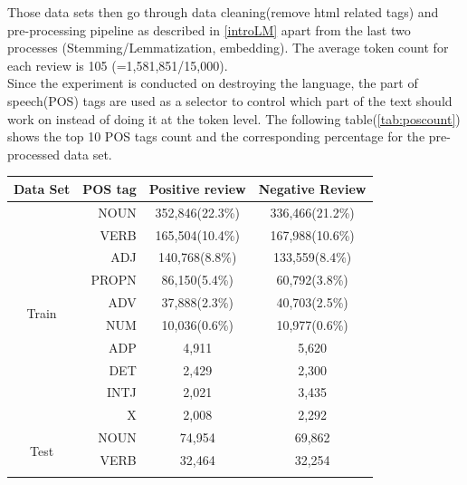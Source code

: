 \documentclass[12pt]{article}
\begin{document}
Those data sets then go through data cleaning(remove html related tags) and pre-processing pipeline as described in \ref{introLM} apart from the last two processes (Stemming/Lemmatization, embedding). The average token count for each review is 105 (=1,581,851/15,000). \\

Since the experiment is conducted on destroying the language, the part of speech(POS) tags are used as a selector to control which part of the text should work on instead of doing it at the token level. The following table(\ref{tab:poscount}) shows the top 10 POS tags count and the corresponding percentage  for the pre-processed data set.

\begin{table}[!h]
\begin{center}
\fontsize{9pt}{9pt}\selectfont
\begin{tabular}{|c|r|c|c|}
\hline
\multicolumn{1}{|l|}{Data Set} & POS tag & Positive review & Negative Review \\ \hline
\multirow{10}{*}{Train}        & NOUN    & 352,846(22.3\%) & 336,466(21.2\%) \\ \cline{2-4} 
                               & VERB    & 165,504(10.4\%)& 167,988(10.6\%) \\ \cline{2-4} 
                               & ADJ     & 140,768(8.8\%) & 133,559(8.4\%)  \\ \cline{2-4} 
                               & PROPN   & 86,150(5.4\%)   & 60,792(3.8\%)  \\ \cline{2-4} 
                               & ADV     & 37,888(2.3\%)   & 40,703(2.5\%)  \\ \cline{2-4} 
                               & NUM     & 10,036(0.6\%)   & 10,977(0.6\%)  \\ \cline{2-4} 
                               & ADP     & 4,911           & 5,620           \\ \cline{2-4} 
                               & DET     & 2,429           & 2,300           \\ \cline{2-4} 
                               & INTJ    & 2,021           & 3,435           \\ \cline{2-4} 
                               & X       & 2,008           & 2,292           \\ \hline
\multirow{10}{*}{Test}         & NOUN    & 74,954          & 69,862          \\ \cline{2-4} 
                               & VERB    & 32,464          & 32,254          \\ \cline{2-4} 

\end{tabular}
\end{center}
\end{table}
\end{document}

